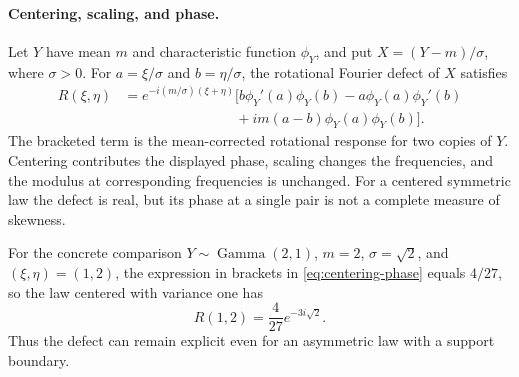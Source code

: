 \paragraph{Centering, scaling, and phase.}
Let $Y$ have mean \(m\) and characteristic function \(\phi_Y\), and put
\(X=(Y-m)/\sigma\), where \(\sigma>0\).
For \(a=\xi/\sigma\) and \(b=\eta/\sigma\), the rotational Fourier defect
of $X$ satisfies
\begin{equation}
 \begin{aligned}
 R(\xi,\eta)
 &=e^{-i(m/\sigma)(\xi+\eta)}
 \bigl[b\phi_Y'(a)\phi_Y(b)-a\phi_Y(a)\phi_Y'(b)\\
 &\hspace{8em}+im(a-b)\phi_Y(a)\phi_Y(b)\bigr].
 \end{aligned}
 \label{eq:centering-phase}
\end{equation}
The bracketed term is the mean-corrected rotational response for two copies of
\(Y\).  Centering contributes the displayed phase, scaling changes the
frequencies, and the modulus at corresponding frequencies is unchanged.  For
a centered symmetric law the defect is real, but its phase at a single pair is
not a complete measure of skewness.

For the concrete comparison $Y\sim\operatorname{Gamma}(2,1)$,
$m=2$, $\sigma=\sqrt2$, and $(\xi,\eta)=(1,2)$, the expression in brackets in
\eqref{eq:centering-phase} equals $4/27$, so the law centered with variance one has
\[
 R(1,2)=\frac4{27}e^{-3i\sqrt2}.
\]
Thus the defect can remain explicit even for an asymmetric law with a support
boundary.

